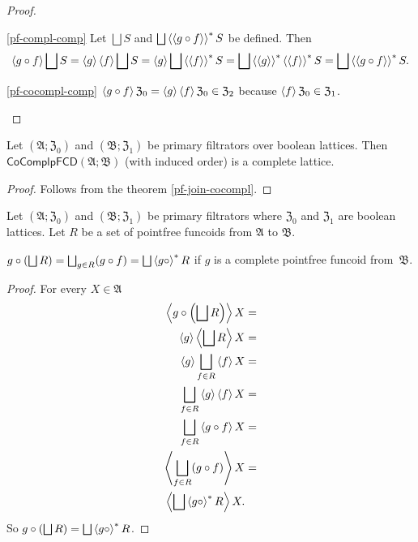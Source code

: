 \begin{proof}
~
\begin{widedisorder}
\item [{\ref{pf-compl-comp}}] Let $\bigsqcup S$ and $\bigsqcup\left\langle \left\langle g\circ f\right\rangle\right\rangle ^{\ast}S$
be defined. Then
\[
\left\langle g\circ f\right\rangle\bigsqcup S=\left\langle g\right\rangle\left\langle f\right\rangle\bigsqcup S=\left\langle g\right\rangle\bigsqcup\left\langle \left\langle f\right\rangle\right\rangle ^{\ast}S=\bigsqcup\left\langle \left\langle g\right\rangle\right\rangle ^{\ast}\left\langle \left\langle f\right\rangle\right\rangle ^{\ast}S=\bigsqcup\left\langle \left\langle g\circ f\right\rangle\right\rangle ^{\ast}S.
\]

\item [{\ref{pf-cocompl-comp}}] $\left\langle g\circ f\right\rangle\mathfrak{Z}_{0}=\left\langle g\right\rangle\left\langle f\right\rangle\mathfrak{Z}_{0}\in\mathfrak{Z}_{2}$
because $\left\langle f\right\rangle\mathfrak{Z}_{0}\in\mathfrak{Z}_{1}$.
\end{widedisorder}
\end{proof}
\begin{prop}
Let $(\mathfrak{A};\mathfrak{Z}_{0})$ and $(\mathfrak{B};\mathfrak{Z}_{1})$
be primary filtrators over boolean lattices. Then $\mathsf{CoComplpFCD}(\mathfrak{A};\mathfrak{B})$
(with induced order) is a complete lattice.\end{prop}
\begin{proof}
Follows from the theorem \ref{pf-join-cocompl}.\end{proof}
\begin{thm}
Let $(\mathfrak{A};\mathfrak{Z}_{0})$ and $(\mathfrak{B};\mathfrak{Z}_{1})$
be primary filtrators where $\mathfrak{Z}_{0}$ and $\mathfrak{Z}_{1}$
are boolean lattices. Let $R$ be a set of pointfree funcoids from
$\mathfrak{A}$ to $\mathfrak{B}$.

$g\circ\left(\bigsqcup R\right)=\bigsqcup_{g\in R}(g\circ f)=\bigsqcup\left\langle g\circ\right\rangle ^{\ast}R$
if $g$ is a complete pointfree funcoid from~$\mathfrak{B}$.\end{thm}
\begin{proof}
For every $X\in\mathfrak{A}$
\begin{align*}
\left\langle g\circ\left(\bigsqcup R\right)\right\rangle X & =\\
\left\langle g\right\rangle\left\langle \bigsqcup R\right\rangle X & =\\
\left\langle g\right\rangle\bigsqcup_{f\in R}\left\langle f\right\rangle X & =\\
\bigsqcup_{f\in R}\left\langle g\right\rangle\left\langle f\right\rangle X & =\\
\bigsqcup_{f\in R}\left\langle g\circ f\right\rangle X & =\\
\left\langle \bigsqcup_{f\in R}(g\circ f)\right\rangle X & =\\
\left\langle \bigsqcup\left\langle g\circ\right\rangle ^{\ast}R\right\rangle X.
\end{align*}
So $g\circ\left(\bigsqcup R\right)=\bigsqcup\left\langle g\circ\right\rangle ^{\ast}R$.
\end{proof}

